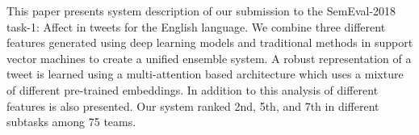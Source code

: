 This paper presents system description of our submission to the SemEval-2018 task-1: Affect in tweets for the English language. We combine three different features generated using deep learning models and traditional methods in support vector machines to create a unified ensemble system. A robust representation of a tweet is learned using a multi-attention based architecture which uses a mixture of different pre-trained embeddings. In addition to this analysis of different features is also presented. Our system ranked 2nd, 5th, and 7th in different subtasks among 75 teams.
